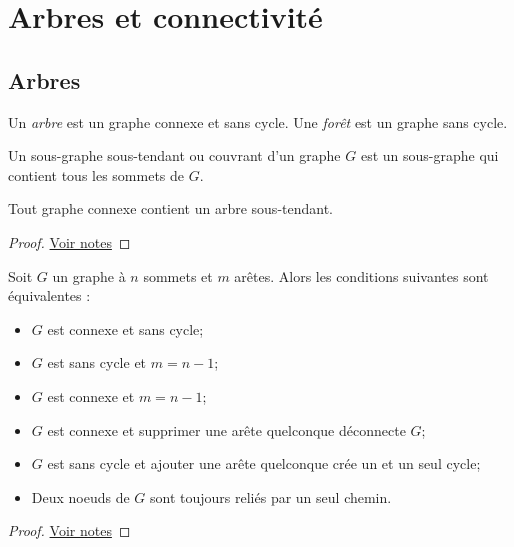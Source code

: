 \section{Arbres et connectivité}
\subsection{Arbres}
\begin{mydef}
  Un \emph{arbre} est un graphe connexe et sans cycle. Une \emph{forêt} est un graphe sans cycle.
\end{mydef}

\begin{mydef}
  Un sous-graphe sous-tendant ou couvrant d’un graphe $G$ est un sous-graphe qui contient tous les sommets de $G$.
\end{mydef}

\begin{mytheo}   
  Tout graphe connexe contient un arbre sous-tendant.
  \begin{proof}
     \href{https://dl.dropboxusercontent.com/u/44092863/Graph_Theory_Romain_Capron.pdf}{Voir notes}
  \end{proof}
\end{mytheo}

\begin{mytheo} 
  Soit $G$ un graphe à $n$ sommets et $m$ arêtes. Alors les conditions suivantes sont équivalentes :
  \begin{itemize}
    \item $G$ est connexe et sans cycle;
    \item $G$ est sans cycle et $m = n − 1$;
    \item $G$ est connexe et $m = n − 1$;
    \item $G$ est connexe et supprimer une arête quelconque déconnecte $G$;
    \item $G$ est sans cycle et ajouter une arête quelconque crée un et un seul cycle;
    \item Deux noeuds de $G$ sont toujours reliés par un seul chemin.
  \end{itemize}
  \begin{proof}
     \href{https://dl.dropboxusercontent.com/u/44092863/Graph_Theory_Romain_Capron.pdf}{Voir notes}
  \end{proof}
\end{mytheo}